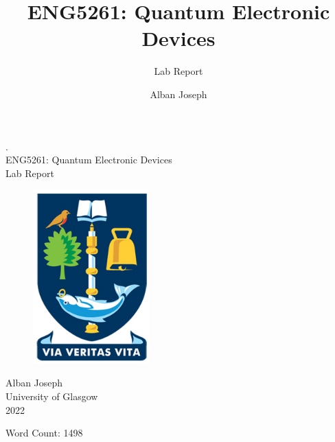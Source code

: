 \documentclass{report}
\title{ENG5261: Quantum Electronic Devices}
\author{Lab Report}
\date{Alban Joseph}
\begin{document}
\begin{titlepage}
\begin{center}
.\\
\vspace{2cm}
    {\Huge ENG5261: Quantum Electronic Devices}\\
        \vspace{0.2cm}
        {\large Lab Report}



        \vspace{60pt}
        
        \begin{figure}[ht]
        \centering
        \includegraphics[width=0.4\textwidth]{University_of_Glasgow_Coat_of_Arms.jpg}
        \end{figure}
        
        
        
        \normalsize
        \vfill %
        Alban Joseph\\
        University of Glasgow\\
        2022
     
        
        \vspace{40pt}

        Word Count:  1498\\

          
	\end{center}
\end{titlepage}
\clearpage



\appendix




\end{document}
